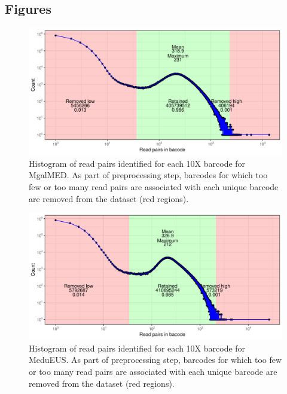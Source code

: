 \documentclass[11pt, a4paper]{article}
\begin{document}
\subsection*{Figures}
\begin{figure}[h]
	\includegraphics[width=\linewidth]{figures/MgalMED_preproc_barcode_filt.pdf}
	\caption{Histogram of read pairs identified for each 10X barcode for MgalMED.
		As part of preprocessing step, barcodes for which too few or too many read pairs are associated with each unique barcode are removed from the dataset (red regions).}
	\label{supfig:preproc_MgalMED}
\end{figure}

\begin{figure}[h]
	\includegraphics[width=\linewidth]{figures/MeduEUS_preproc_barcode_filt.pdf}
	\caption{Histogram of read pairs identified for each 10X barcode for MeduEUS.
		As part of preprocessing step, barcodes for which too few or too many read pairs are associated with each unique barcode are removed from the dataset (red regions).}
	\label{supfig:preproc_MeduEUS}
\end{figure}
\end{document}
